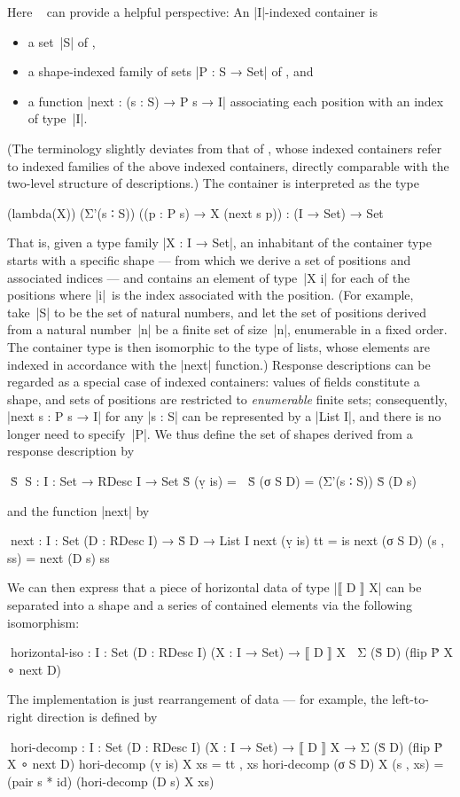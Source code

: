 Here ~\citep[Chapter~8]{Morris-thesis} can provide a helpful perspective:
An |I|-indexed container is
\begin{itemize}
\item a set~|S| of ,
\item a shape-indexed family of sets |P : S → Set| of , and
\item a function |next : (s : S) → P s → I| associating each position with an index of type~|I|.
\end{itemize}
(The terminology slightly deviates from that of \citeauthor{Morris-thesis}, whose indexed containers refer to indexed families of the above indexed containers, directly comparable with the two-level structure of descriptions.)
The container is interpreted as the type
\begin{code}
(lambda(X)) (Σ'(s ∶ S)) ((p : P s) → X (next s p)) : (I → Set) → Set
\end{code}
That is, given a type family |X : I → Set|, an inhabitant of the container type starts with a specific shape --- from which we derive a set of positions and associated indices --- and contains an element of type~|X i| for each of the positions where |i|~is the index associated with the position.
(For example, take~|S| to be the set of natural numbers, and let the set of positions derived from a natural number~|n| be a finite set of size~|n|, enumerable in a fixed order.
The container type is then isomorphic to the type of lists, whose elements are indexed in accordance with the |next| function.)
Response descriptions can be regarded as a special case of indexed containers: values of fields constitute a shape, and sets of positions are restricted to \emph{enumerable} finite sets; consequently, |next s : P s → I| for any |s : S| can be represented by a |List I|, and there is no longer need to specify~|P|.
We thus define the set of shapes derived from a response description by
\begin{code}
^^^Ṡ ^^^S : {I : Set} → RDesc I → Set
Ṡ (ṿ is)   = ⊤
Ṡ (σ S D)  = (Σ'(s ∶ S)) Ṡ (D s)
\end{code}
and the function |next| by
\begin{code}
^^^next : {I : Set} (D : RDesc I) → Ṡ D → List I
next (ṿ is)   tt        = is
next (σ S D)  (s , ss)  = next (D s) ss
\end{code}
We can then express that a piece of horizontal data of type |⟦ D ⟧ X| can be separated into a shape and a series of contained elements via the following isomorphism:
\begin{code}
^^^horizontal-iso :  {I : Set} (D : RDesc I) (X : I → Set) →
                     ⟦ D ⟧ X ≅ Σ (Ṡ D) (flip Ṗ X ∘ next D)
\end{code}
The implementation is just rearrangement of data --- for example, the left-to-right direction is defined by
\begin{code}
^^^hori-decomp :  {I : Set} (D : RDesc I) (X : I → Set) →
                  ⟦ D ⟧ X → Σ (Ṡ D) (flip Ṗ X ∘ next D)
hori-decomp (ṿ is)   X xs        = tt , xs
hori-decomp (σ S D)  X (s , xs)  = (pair s * id) (hori-decomp (D s) X xs)
\end{code}

